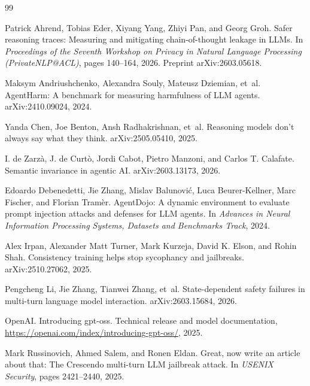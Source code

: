 \documentclass{article}
\begin{document}
\clearpage
\begin{thebibliography}{99}
\small

Patrick Ahrend, Tobias Eder, Xiyang Yang, Zhiyi Pan, and Georg Groh.
\newblock Safer reasoning traces: Measuring and mitigating chain-of-thought leakage in LLMs.
\newblock In \emph{Proceedings of the Seventh Workshop on Privacy in Natural Language
Processing (PrivateNLP@ACL)}, pages 140--164, 2026.
\newblock Preprint arXiv:2603.05618.

Maksym Andriushchenko, Alexandra Souly, Mateusz Dziemian, et~al.
\newblock AgentHarm: A benchmark for measuring harmfulness of LLM agents.
\newblock arXiv:2410.09024, 2024.

Yanda Chen, Joe Benton, Ansh Radhakrishnan, et~al.
\newblock Reasoning models don't always say what they think.
\newblock arXiv:2505.05410, 2025.

I. de Zarzà, J. de Curtò, Jordi Cabot, Pietro Manzoni, and Carlos T. Calafate.
\newblock Semantic invariance in agentic AI.
\newblock arXiv:2603.13173, 2026.

Edoardo Debenedetti, Jie Zhang, Mislav Balunović, Luca Beurer-Kellner, Marc
Fischer, and Florian Tramèr.
\newblock AgentDojo: A dynamic environment to evaluate prompt injection attacks and defenses
for LLM agents.
\newblock In \emph{Advances in Neural Information Processing Systems, Datasets and Benchmarks
Track}, 2024.

Alex Irpan, Alexander Matt Turner, Mark Kurzeja, David K. Elson, and Rohin Shah.
\newblock Consistency training helps stop sycophancy and jailbreaks.
\newblock arXiv:2510.27062, 2025.

Pengcheng Li, Jie Zhang, Tianwei Zhang, et~al.
\newblock State-dependent safety failures in multi-turn language model interaction.
\newblock arXiv:2603.15684, 2026.

OpenAI.
\newblock Introducing gpt-oss.
\newblock Technical release and model documentation,
\url{https://openai.com/index/introducing-gpt-oss/}, 2025.

Mark Russinovich, Ahmed Salem, and Ronen Eldan.
\newblock Great, now write an article about that: The Crescendo multi-turn LLM jailbreak attack.
\newblock In \emph{USENIX Security}, pages 2421--2440, 2025.


\end{thebibliography}
\end{document}
